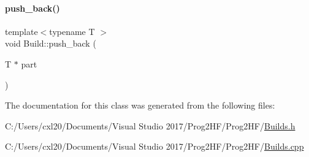 \paragraph{\texorpdfstring{push\_back()}{push\_back()}}
{\footnotesize\ttfamily template$<$typename T $>$ \\
void Build\+::push\+\_\+back (\begin{DoxyParamCaption}\item[{T $\ast$}]{part }\end{DoxyParamCaption})}



The documentation for this class was generated from the following files\+:\begin{DoxyCompactItemize}
\item 
C\+:/\+Users/cxl20/\+Documents/\+Visual Studio 2017/\+Prog2\+H\+F/\+Prog2\+H\+F/\mbox{\hyperlink{_builds_8h}{Builds.\+h}}\item 
C\+:/\+Users/cxl20/\+Documents/\+Visual Studio 2017/\+Prog2\+H\+F/\+Prog2\+H\+F/\mbox{\hyperlink{_builds_8cpp}{Builds.\+cpp}}\end{DoxyCompactItemize}
